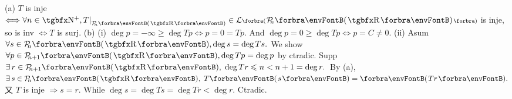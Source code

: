 
(a) $T$ is inje $\Longleftrightarrow\forall n\in\Nbp,T\mmid_{\PoR[\SmallPar]{n}}\in\Lm[\BigPar]{\PoR{n}}$ is inje, so is inv $\Longleftrightarrow T$ is surj.\vspace{2pt}\parSol{}
(b) (i) $\deg p=-\infty\geqslant\deg Tp\Longleftrightarrow p=0=Tp.$ \;And $\deg p=0\geqslant\deg Tp\Longleftrightarrow p=C\neq 0.$\parSol{\vspace{1pt}\Endi\Hb}
(ii) Asum $\forall s\in\PoR{n},\deg s=\deg Ts.$ We show $\forall p\in\PoR{n+1},\deg Tp=\deg p$ by ctradic.\vspace{1pt}\parSol{\Hii\Hb}
Supp $\exists\,r\in\PoR{n+1},\;\deg Tr\leqslant n<n+1=\deg r.$ \,By (a), $\exists\,s\in\PoR{n},\;T\Par{s}=\Par{Tr}.$\parSol{\Hii\Hb}
又 $T$ is inje $\Rightarrow s=r.$ While $\deg s=\deg Ts=\deg Tr<\deg r.$ Ctradic.\PfEnd
\SepLine\pagebreak

